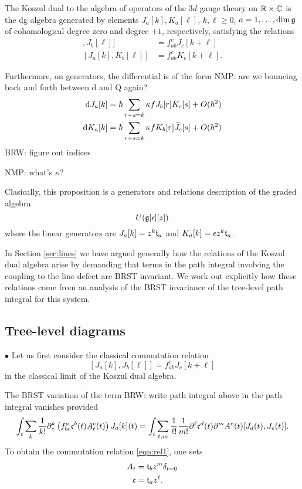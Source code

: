 \documentclass[11pt]{amsart}
\def\brian#1{{\textcolor{blue!65!red}{BRW: {#1}}}}
\def\natalie#1{{\textcolor{green!65!black}{NMP: {#1}}}}
\begin{document}
\begin{prop}
The Koszul dual to the algebra of operators of the $3d$ gauge theory on $\mathbb R \times \mathbb C$ is the dg algebra generated by elements $J_a[k],K_a [\ell]$, $k,\ell \geq 0$, $a = 1,\ldots, \dim \mathfrak g$ of cohomological degree zero and degree $+1$, respectively, satisfying the relations
\begin{align*}
[J_a [k] , J_b [\ell]] & = f_{ab}^c J_{c} [k+\ell] \\
[J_a [k], K_b[\ell]] & = f_{ab}^c K_c [k+\ell] .
\end{align*} 

Furthermore, on generators, the differential is of the form \natalie{are we bouncing back and forth between d and Q again?}
\begin{align*}
{\rm d} J_a[k] & = \hbar \sum_{r + s = k} \kappa f J_b[r] K_c[s] + O(\hbar^2) \\
{\rm d} K_a[k] & = \hbar \sum_{r + s = k} \kappa f K_b[r] \widetilde{J}_c[s] + O(\hbar^2)
\end{align*} 
\brian{figure out indices}
\end{prop}

\natalie{what's $\kappa$?}

Clasically, this proposition is a generators and relations description of the graded algebra 
\[
U(\mathfrak g[\epsilon][z])
\]
where the linear generators are $J_a[k] = z^k \mathfrak t_a$ and $K_a [k] = \epsilon z^k \mathfrak t_a$. 


In Section \ref{sec:lines} we have argued generally how the relations of the Koszul dual algebra arise by demanding that terms in the path integral involving the coupling to the line defect are BRST invariant. 
We work out explicitly how these relations come from an analysis of the BRST invariance of the tree-level path integral for this system.

\subsection*{Tree-level diagrams}

$\bullet$
Let us first consider the classical commutation relation 
\begin{equation}\label{eqn:rel1}
[J_a [k] , J_b [\ell]] = f_{ab}^c J_{c} [k+\ell] 
\end{equation}
in the classical limit of the Koszul dual algebra. 

The BRST variation of the term \brian{write path integral above} in the path integral vanishes provided
\[
\int_t \sum_k \frac1{k!} \partial_z^k \left(f_{bc}^a \mathfrak c^b(t) A^c_t (t) \right) J_a[k] (t) = \int_t \sum_{\ell,m} \frac1{\ell!} \frac1{m!} \partial^\ell \mathfrak c^d (t) \partial^m A^e (t) [J_d (t), J_e(t)]  .
\] 
To obtain the commutation relation \eqref{eqn:rel1}, one sets 
\begin{align*}
A_t & = \mathfrak t_b z^{m} \delta_{t=0} \\
\mathfrak c & = \mathfrak t_a z^\ell .
\end{align*}
\end{document}
